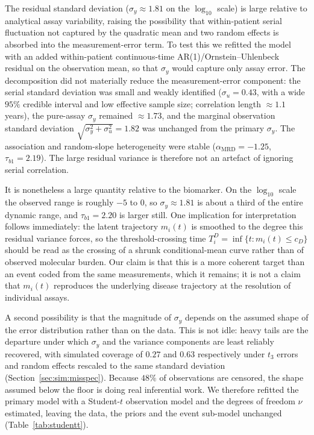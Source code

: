 \documentclass[11pt]{article}
\begin{document}
The residual standard deviation ($\sigma_y\approx1.81$ on the $\log_{10}$ scale) is
large relative to analytical assay variability, raising the possibility that
within-patient serial fluctuation not captured by the quadratic mean and two random
effects is absorbed into the measurement-error term. To test this we refitted the
model with an added within-patient continuous-time AR(1)/Ornstein--Uhlenbeck
residual on the observation mean, so that $\sigma_y$ would capture only assay error.
The decomposition did not materially reduce the measurement-error component: the
serial standard deviation was small and weakly identified ($\sigma_u=0.43$, with a
wide $95\%$ credible interval and low effective sample size; correlation length
$\approx1.1$ years), the pure-assay $\sigma_y$ remained $\approx1.73$, and the
marginal observation standard deviation $\sqrt{\sigma_y^2+\sigma_u^2}=1.82$ was
unchanged from the primary $\sigma_y$. The association and random-slope
heterogeneity were stable ($\alpha_{\mathrm{MRD}}=-1.25$, $\tau_{b1}=2.19$). The
large residual variance is therefore not an artefact of ignoring serial
correlation.

It is nonetheless a large quantity relative to the biomarker. On the
$\log_{10}$ scale the observed range is roughly $-5$ to $0$, so
$\sigma_y\approx1.81$ is about a third of the entire dynamic range, and
$\tau_{b1}=2.20$ is larger still. One implication for interpretation follows
immediately: the latent trajectory $m_i(t)$ is smoothed to the degree this
residual variance forces, so the threshold-crossing time
$T_i^D=\inf\{t: m_i(t)\le c_D\}$ should be read as the crossing of a shrunk
conditional-mean curve rather than of observed molecular burden. Our claim is
that this is a more coherent target than an event coded from the same
measurements, which it remains; it is not a claim that $m_i(t)$ reproduces the
underlying disease trajectory at the resolution of individual assays.

A second possibility is that the magnitude of $\sigma_y$ depends on the assumed
shape of the error distribution rather than on the data. This is not idle:
heavy tails are the departure under which $\sigma_y$ and the variance components
are least reliably recovered, with simulated coverage of $0.27$ and $0.63$
respectively under $t_3$ errors and random effects rescaled to the same standard
deviation (Section~\ref{sec:sim:misspec}). Because $48\%$ of observations are
censored, the shape assumed below the floor is doing real inferential work. We
therefore refitted the primary model with a Student-$t$ observation model and
the degrees of freedom $\nu$ estimated, leaving the data, the priors and the
event sub-model unchanged (Table~\ref{tab:studentt}).
\end{document}
